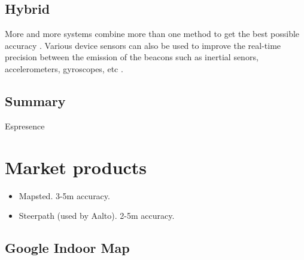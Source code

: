 \subsection{Hybrid}

More and more systems combine more than one method to get the best possible accuracy \cite{shang_overview_2022}. Various device sensors can also be used to improve the real-time precision between the emission of the beacons such as inertial senors, accelerometers, gyroscopes, etc \cite{ali_locali_2017}. 

\subsection{Summary}

Espresence

\section{Market products}

\begin{itemize}
    \item Mapsted. 3-5m accuracy.
    \item Steerpath (used by Aalto). 2-5m accuracy.
\end{itemize}

\subsection{Google Indoor Map}